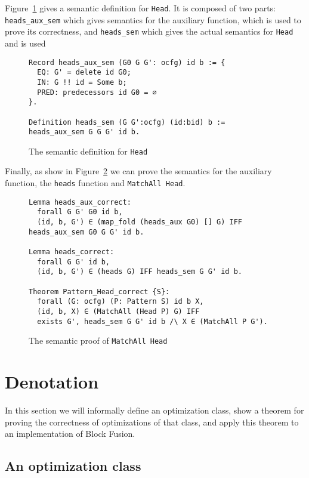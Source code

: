 \documentclass[11pt]{article}
\newcommand{\inlinecoq}[1]{\mbox{\lstinline[style=customcoq,columns=fixed,basewidth=.48em]{#1}}}
\newcommand{\ilc}[1]{\inlinecoq{#1}}
\begin{document}
Figure~\ref{fig:sem_head_def} gives a semantic definition for \ilc{Head}. It is composed of two parts: \ilc{heads_aux_sem} which gives semantics for the auxiliary function, which is used to prove its correctness, and \ilc{heads_sem} which gives the actual semantics for \ilc{Head} and is used 

\begin{figure}
  \begin{lstlisting}[style=customcoq,basicstyle=\small\ttfamily]
Record heads_aux_sem (G0 G G': ocfg) id b := {
  EQ: G' = delete id G0;
  IN: G !! id = Some b;
  PRED: predecessors id G0 = ∅
}.

Definition heads_sem (G G':ocfg) (id:bid) b := heads_aux_sem G G G' id b.
  \end{lstlisting}
  \caption{The semantic definition for \ilc{Head}}
  \label{fig:sem_head_def}
\end{figure}

Finally, as show in Figure~\ref{fig:head_cor} we can prove the semantics for the auxiliary function, the \ilc{heads} function and \ilc{MatchAll Head}.

\begin{figure}
  \begin{lstlisting}[style=customcoq,basicstyle=\small\ttfamily]
Lemma heads_aux_correct:
  forall G G' G0 id b,
  (id, b, G') ∈ (map_fold (heads_aux G0) [] G) IFF heads_aux_sem G0 G G' id b.

Lemma heads_correct:
  forall G G' id b,
  (id, b, G') ∈ (heads G) IFF heads_sem G G' id b.

Theorem Pattern_Head_correct {S}:
  forall (G: ocfg) (P: Pattern S) id b X,
  (id, b, X) ∈ (MatchAll (Head P) G) IFF
  exists G', heads_sem G G' id b /\ X ∈ (MatchAll P G').
  \end{lstlisting}
  \caption{The semantic proof of \ilc{MatchAll Head}}
  \label{fig:head_cor}
\end{figure}

\section{Denotation}
\label{sec:deno}

In this section we will informally define an optimization class, show a theorem for proving the correctness of optimizations of that class, and apply this theorem to an implementation of Block Fusion.

\subsection{An optimization class}
\end{document}
